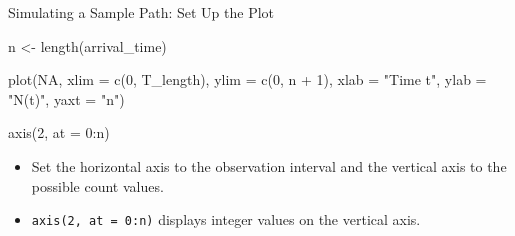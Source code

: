\documentclass[
  ignorenonframetext,
  aspectratio=169,
]{beamer}
\newenvironment{Shaded}{\begin{snugshade}}{\end{snugshade}}
\newcommand{\AttributeTok}[1]{\textcolor[rgb]{0.40,0.45,0.13}{#1}}
\newcommand{\ConstantTok}[1]{\textcolor[rgb]{0.56,0.35,0.01}{#1}}
\newcommand{\DecValTok}[1]{\textcolor[rgb]{0.68,0.00,0.00}{#1}}
\newcommand{\FunctionTok}[1]{\textcolor[rgb]{0.28,0.35,0.67}{#1}}
\newcommand{\NormalTok}[1]{\textcolor[rgb]{0.00,0.23,0.31}{#1}}
\newcommand{\OtherTok}[1]{\textcolor[rgb]{0.00,0.23,0.31}{#1}}
\newcommand{\SpecialCharTok}[1]{\textcolor[rgb]{0.37,0.37,0.37}{#1}}
\newcommand{\StringTok}[1]{\textcolor[rgb]{0.13,0.47,0.30}{#1}}
\providecommand{\tightlist}{%
  \setlength{\itemsep}{0pt}\setlength{\parskip}{0pt}}
\begin{document}
\begin{frame}[fragile]{Simulating a Sample Path: Set Up the Plot}
\protect{}\label{simulating-a-sample-path-set-up-the-plot}
\begin{Shaded}
\begin{Highlighting}[]
\NormalTok{n }\OtherTok{\textless{}{-}} \FunctionTok{length}\NormalTok{(arrival\_time)}

\FunctionTok{plot}\NormalTok{(}\ConstantTok{NA}\NormalTok{, }\AttributeTok{xlim =} \FunctionTok{c}\NormalTok{(}\DecValTok{0}\NormalTok{, T\_length), }\AttributeTok{ylim =} \FunctionTok{c}\NormalTok{(}\DecValTok{0}\NormalTok{, n }\SpecialCharTok{+} \DecValTok{1}\NormalTok{),}
     \AttributeTok{xlab =} \StringTok{"Time t"}\NormalTok{, }\AttributeTok{ylab =} \StringTok{"N(t)"}\NormalTok{, }\AttributeTok{yaxt =} \StringTok{"n"}\NormalTok{)}

\FunctionTok{axis}\NormalTok{(}\DecValTok{2}\NormalTok{, }\AttributeTok{at =} \DecValTok{0}\SpecialCharTok{:}\NormalTok{n)}
\end{Highlighting}
\end{Shaded}

\begin{itemize}
\tightlist
\item
  Set the horizontal axis to the observation interval and the vertical
  axis to the possible count values.
\item
  \texttt{axis(2,\ at\ =\ 0:n)} displays integer values on the vertical
  axis.
\end{itemize}
\end{frame}
\end{document}

